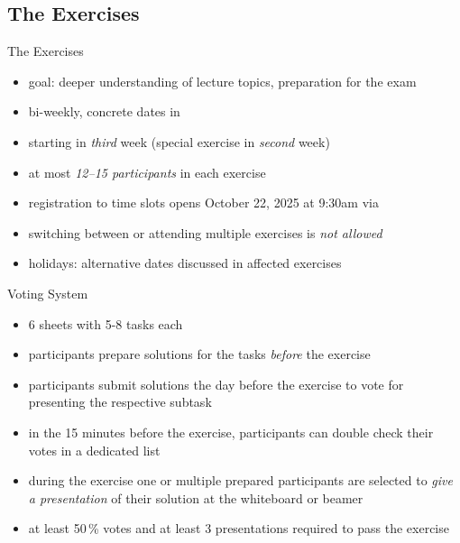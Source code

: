 \subsection{The Exercises}
\begin{frame}{\insertsubsection}
	\begin{fancycolumns}[widths={43}]
		\begin{definition}{The Exercises}
			\begin{itemize}
				\item goal: deeper understanding of lecture topics, preparation for the exam
				\item bi-weekly, concrete dates in \StudIPExercise
				\item starting in \emph{third} week (special exercise in \emph{second} week)
				\item at most \emph{12--15 participants} in each exercise
				\item registration to time slots opens October 22, 2025 at 9:30am via \StudIPExercise
				\item switching between or attending multiple exercises is \emph{not allowed}
				\item holidays: alternative dates discussed in affected exercises
			\end{itemize}
		\end{definition}
		\nextcolumn
		\begin{definition}{Voting System }
			\begin{itemize}
				\item 6 sheets with 5-8 tasks each
				\item participants prepare solutions for the tasks \emph{before} the exercise
				\item participants submit solutions the day before the exercise to vote  for presenting the respective subtask
				\item in the 15 minutes before the exercise, participants can double check their votes  in a dedicated list 
				\item during the exercise one or multiple prepared participants are selected to \emph{give a presentation} of their solution at the whiteboard or beamer
				\item at least 50\,\% votes  and at least 3 presentations  required to pass the exercise 
			\end{itemize}
		\end{definition}
	\end{fancycolumns}
\end{frame}

